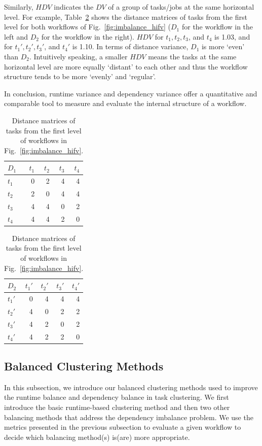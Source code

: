 Similarly, $HDV$ indicates the $DV$ of a group of tasks/jobs at the same horizontal level. For example, Table~\ref{tab:imblance_metric} shows the distance matrices of tasks from the first level for both workflows of Fig.~\ref{fig:imbalance_hifv} ($D_1$ for the workflow in the left and $D_2$ for the workflow in the right). $HDV$ for $t_1, t_2, t_3$, and $t_4$ is 1.03, and for $t_1', t_2', t_3'$, and $t_4'$ is 1.10. In terms of distance variance, $D_1$ is more `even' than $D_2$. Intuitively speaking, a smaller $HDV$ means the tasks at the same horizontal level are more equally `distant' to each other and thus the workflow structure tends to be more `evenly' and `regular'. 

In conclusion, runtime variance and dependency variance offer a quantitative and comparable tool to measure and evaluate the internal structure of a workflow. 


\begin{table}[htb]
	\footnotesize
	\centering
	\begin{tabular}{l|rrrr}
		$D_1$ & $t_1$ & $t_2$ & $t_3$ &$t_4$\\
		\hline
		$t_1$ & 0 & 2 & 4 & 4 \\
		$t_2$ & 2 & 0 & 4 & 4 \\
		$t_3$ & 4 & 4 & 0 & 2\\
		$t_4$ & 4 & 4 & 2 & 0 \\
	\end{tabular}
	\quad
	\begin{tabular}{l|rrrr}
		$D_2$ & $t_1'$ & $t_2'$ & $t_3'$ &$t_4'$\\
		\hline
		$t_1'$ & 0 & 4 & 4 & 4 \\
		$t_2'$ & 4 & 0 & 2 & 2 \\
		$t_3'$ & 4 & 2 & 0 & 2\\
		$t_4'$ & 4 & 2 & 2 & 0 \\
	\end{tabular}
	\caption{Distance matrices of tasks from the first level of workflows in Fig.~\ref{fig:imbalance_hifv}.}
	\label{tab:imblance_metric}
\end{table}


\subsection{Balanced Clustering Methods}
\label{sec:methods}
In this subsection, we introduce our balanced clustering methods used to improve the runtime balance and dependency balance in task clustering. We first introduce the basic runtime-based clustering method and then two other balancing methods that address the dependency imbalance problem. We use the metrics presented in the previous subsection to evaluate a given workflow to decide which balancing method(s) is(are) more appropriate. 

